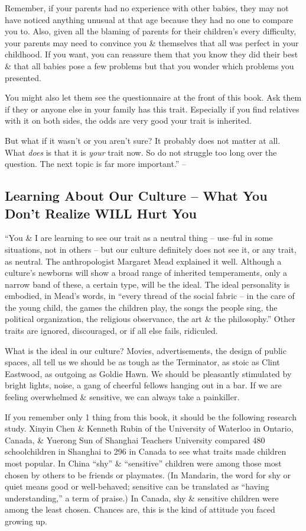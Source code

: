 \documentclass{article}
\numberwithin{equation}{section}
\begin{document}
Remember, if your parents had no experience with other babies, they may not have noticed anything unusual at that age because they had no one to compare you to. Also, given all the blaming of parents for their children's every difficulty, your parents may need to convince you \& themselves that all was perfect in your childhood. If you want, you can reassure them that you know they did their best \& that all babies pose a few problems but that you wonder which problems you presented.

You might also let them see the questionnaire at the front of this book. Ask them if they or anyone else in your family has this trait. Especially if you find relatives with it on both sides, the odds are very good your trait is inherited.

But what if it wasn't or you aren't sure? It probably does not matter at all. What \textit{does} is that it is \textit{your} trait now. So do not struggle too long over the question. The next topic is far more important.'' -- \cite[pp. 47--48]{Aron2013}

\subsection{Learning About Our Culture -- What You Don't Realize WILL Hurt You}
``You \& I are learning to see our trait as a neutral thing -- use--ful in some situations, not in others -- but our culture definitely does not see it, or any trait, as neutral. The anthropologist Margaret Mead explained it well. Although a culture's newborns will show a broad range of inherited temperaments, only a narrow band of these, a certain type, will be the ideal. The ideal personality is embodied, in Mead's words, in ``every thread of the social fabric -- in the care of the young child, the games the children play, the songs the people sing, the political organization, the religious observance, the art \& the philosophy.'' Other traits are ignored, discouraged, or if all else fails, ridiculed.

What is the ideal in our culture? Movies, advertisements, the design of public spaces, all tell us we should be as tough as the Terminator, as stoic as Clint Eastwood, as outgoing as Goldie Hawn. We should be pleasantly stimulated by bright lights, noise, a gang of cheerful fellows hanging out in a bar. If we are feeling overwhelmed \& sensitive, we can always take a painkiller.

If you remember only 1 thing from this book, it should be the following research study. Xinyin Chen \& Kenneth Rubin of the University of Waterloo in Ontario, Canada, \& Yuerong Sun of Shanghai Teachers University compared 480 schoolchildren in Shanghai to 296 in Canada to see what traits made children most popular. In China ``shy'' \& ``sensitive'' children were among those most chosen by others to be friends or playmates. (In Mandarin, the word for shy or quiet means good or well-behaved; sensitive can be translated as ``having understanding,'' a term of praise.) In Canada, shy \& sensitive children were among the least chosen. Chances are, this is the kind of attitude you faced growing up.
\end{document}
